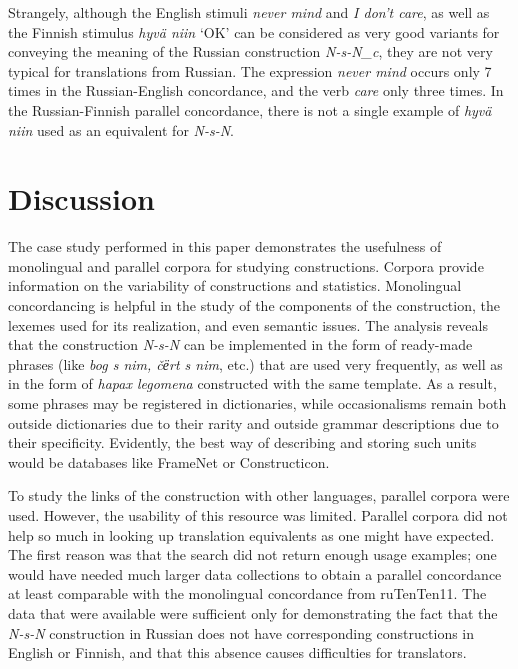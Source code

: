 \documentclass[output=paper]{langscibook}
\begin{document}
\glt 
\z

Strangely, although the English stimuli \textit{never mind} and \textit{I don’t care}, as well as the Finnish stimulus \textit{hyvä niin} ‘OK’ can be considered as very good variants for conveying the meaning of the Russian construction \textit{N-s-N\_c}, they are not very typical for translations from Russian. The expression \textit{never mind} occurs only 7 times in the Russian-English concordance, and the verb \textit{care} only three times. In the Russian-Finnish parallel concordance, there is not a single example of \textit{hyvä niin} used as an equivalent for \textit{N-s-N}.

\section{Discussion}

The case study performed in this paper demonstrates the usefulness of monolingual and parallel corpora for studying constructions. Corpora provide information on the variability of constructions and statistics. Monolingual concordancing is helpful in the study of the components of the construction, the lexemes used for its realization, and even semantic issues. The analysis reveals that the construction \textit{N-s-N} can be implemented in the form of ready-made phrases (like \textit{bog s nim, č{ё}rt s nim}, etc.) that are used very frequently, as well as in the form of \textit{hapax legomena} constructed with the same template. As a result, some phrases may be registered in dictionaries, while occasionalisms remain both outside dictionaries due to their rarity and outside grammar descriptions due to their specificity. Evidently, the best way of describing and storing such units would be databases like FrameNet or Constructicon.

To study the links of the construction with other languages, parallel corpora were used. However, the usability of this resource was limited. Parallel corpora did not help so much in looking up translation equivalents as one might have expected. The first reason was that the search did not return enough usage examples; one would have needed much larger data collections to obtain a parallel concordance at least comparable with the monolingual concordance from ruTenTen11. The data that were available were sufficient only for demonstrating the fact that the \textit{N-s-N} construction in Russian does not have corresponding constructions in English or Finnish, and that this absence causes difficulties for translators.
\end{document}
